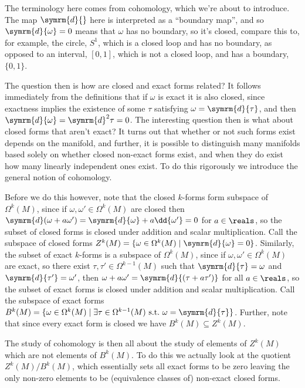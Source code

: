 \documentclass[fleqn]{NotesClass}
\renewcommand{\dl}{\symrm{d}}
\begin{document}
    The terminology here comes from cohomology, which we're about to introduce.
    The map \(\dl{}\) here is interpreted as a \enquote{boundary map}, and so \(\dl{\omega} = 0\) means that \(\omega\) has no boundary, so it's closed, compare this to, for example, the circle, \(S^1\), which is a closed loop and has no boundary, as opposed to an interval, \([0, 1]\), which is not a closed loop, and has a boundary, \(\{0, 1\}\).
    
    The question then is how are closed and exact forms related?
    It follows immediately from the definitions that if \(\omega\) is exact it is also closed, since exactness implies the existence of some \(\tau\) satisfying \(\omega = \dl{\tau}\), and then \(\dl{\omega} = \dl^2\tau = 0\).
    The interesting question then is what about closed forms that aren't exact?
    It turns out that whether or not such forms exist depends on the manifold, and further, it is possible to distinguish many manifolds based solely on whether closed non-exact forms exist, and when they do exist how many linearly independent ones exist.
    To do this rigorously we introduce the general notion of cohomology.
    
    Before we do this however, note that the closed \(k\)-forms form subspace of \(\Omega^k(M)\), since if \(\omega, \omega' \in \Omega^k(M)\) are closed then \(\dl(\omega + a \omega') = \dl{\omega} + a\dd{\omega'} = 0\) for \(a \in \reals\), so the subset of closed forms is closed under addition and scalar multiplication.
    Call the subspace of closed forms \(Z^k(M) = \{\omega \in \Omega^k(M) \mid \dl{\omega} = 0\}\).
    Similarly, the subset of exact \(k\)-forms is a subspace of \(\Omega^k(M)\), since if \(\omega, \omega' \in \Omega^k(M)\) are exact, so there exist \(\tau, \tau' \in \Omega^{k-1}(M)\) such that \(\dl{\tau} = \omega\) and \(\dl{\tau'} = \omega'\), then \(\omega + a\omega' = \dl{(\tau + a\tau')}\) for all \(a \in \reals\), so the subset of exact forms is closed under addition and scalar multiplication.
    Call the subspace of exact forms \(B^k(M) = \{\omega \in \Omega^k(M) \mid \exists \tau \in \Omega^{k-1}(M) \text{ s.t.\@ } \omega = \dl{\tau}\}\).
    Further, note that since every exact form is closed we have \(B^k(M) \subseteq Z^k(M)\).
    
    The study of cohomology is then all about the study of elements of \(Z^k(M)\) which are not elements of \(B^k(M)\).
    To do this we actually look at the quotient \(Z^k(M)/B^k(M)\), which essentially sets all exact forms to be zero leaving the only non-zero elements to be (equivalence classes of) non-exact closed forms.
    
\end{document}
